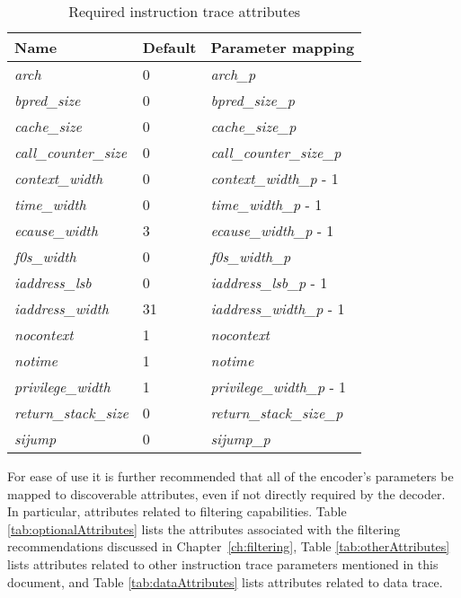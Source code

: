 \begin{table}[!h]
    \centering
    \caption{Required instruction trace attributes}
    \label{tab:requiredAttributes}
    \begin{tabulary}{\textwidth}{|l|l|p{80mm}|}
        \hline
        \textbf{Name} & \textbf{Default} & \textbf{Parameter mapping} \\
        \hline
        \textit{arch} & 0 & \textit{arch\_p} \\
        \hline
        \textit{bpred\_size} & 0 & \textit{bpred\_size\_p}  \\
        \hline
        \textit{cache\_size} & 0 & \textit{cache\_size\_p} \\
        \hline
        \textit{call\_counter\_size} & 0 & \textit{call\_counter\_size\_p} \\
        \hline
        \textit{context\_width} & 0 & \textit{context\_width\_p} - 1 \\
        \hline
        \textit{time\_width} & 0 & \textit{time\_width\_p} - 1 \\
        \hline
        \textit{ecause\_width} & 3 & \textit{ecause\_width\_p} - 1 \\
        \hline
        \textit{f0s\_width} & 0 & \textit{f0s\_width\_p} \\
        \hline
        \textit{iaddress\_lsb} & 0 & \textit{iaddress\_lsb\_p} - 1 \\
        \hline
        \textit{iaddress\_width} & 31 & \textit{iaddress\_width\_p} - 1 \\
        \hline
        \textit{nocontext} & 1 & \textit{nocontext} \\
        \hline
        \textit{notime} & 1 & \textit{notime} \\
        \hline
        \textit{privilege\_width} & 1 & \textit{privilege\_width\_p} - 1 \\
        \hline
        \textit{return\_stack\_size} & 0 & \textit{return\_stack\_size\_p} \\
        \hline
        \textit{sijump} & 0 & \textit{sijump\_p} \\
        \hline
    \end{tabulary}
\end{table}

For ease of use it is further recommended that all of the encoder's parameters be mapped to 
discoverable attributes, even if not directly required by the decoder.  In particular, 
attributes related to filtering capabilities.  Table \ref{tab:optionalAttributes} lists the attributes
associated with the filtering recommendations discussed in Chapter~\ref{ch:filtering},  
Table \ref{tab:otherAttributes} lists attributes related to other instruction trace
parameters mentioned in this document, and Table \ref{tab:dataAttributes} lists 
attributes related to data trace.

